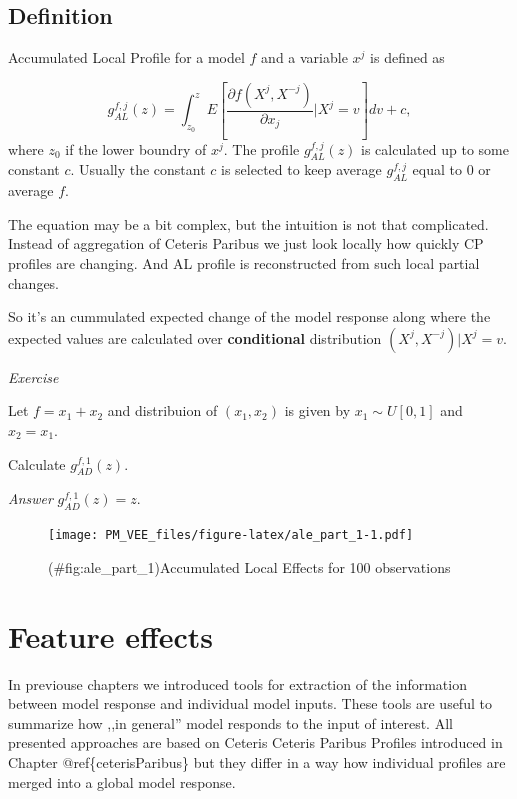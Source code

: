 \documentclass[12pt,]{krantz}
\begin{document}
\hypertarget{definition-2}{%
\subsection{Definition}\label{definition-2}}

Accumulated Local Profile for a model \(f\) and a variable \(x^j\) is defined as

\[
g_{AL}^{f, j}(z) = \int_{z_0}^z E\left[\frac{\partial f(X^j, X^{-j})}{\partial x_j}|X^j = v\right] dv + c,
\]
where \(z_0\) if the lower boundry of \(x^j\). The profile \(g_{AL}^{f, j}(z)\) is calculated up to some constant \(c\). Usually the constant \(c\) is selected to keep average \(g_{AL}^{f, j}\) equal to 0 or average \(f\).

The equation may be a bit complex, but the intuition is not that complicated. Instead of aggregation of Ceteris Paribus we just look locally how quickly CP profiles are changing. And AL profile is reconstructed from such local partial changes.

So it's an cummulated expected change of the model response along where the expected values are calculated over \textbf{conditional} distribution \((X^j,X^{-j})|X^j=v\).

\emph{Exercise}

Let \(f = x_1 + x_2\) and distribuion of \((x_1, x_2)\) is given by \(x_1 \sim U[0,1]\) and \(x_2=x_1\).

Calculate \(g_{AD}^{f, 1}(z)\).

\emph{Answer} \(g_{AD}^{f, 1}(z) = z\).

\begin{figure}
\centering
\texttt{[image: PM\_VEE\_files/figure-latex/ale\_part\_1-1.pdf]}
\caption{(\#fig:ale\_part\_1)Accumulated Local Effects for 100 observations}
\end{figure}

\hypertarget{featureEffects}{%
\section{Feature effects}\label{featureEffects}}

In previouse chapters we introduced tools for extraction of the information between model response and individual model inputs. These tools are useful to summarize how ,,in general'' model responds to the input of interest. All presented approaches are based on Ceteris Ceteris Paribus Profiles introduced in Chapter @ref\{ceterisParibus\} but they differ in a way how individual profiles are merged into a global model response.
\end{document}
